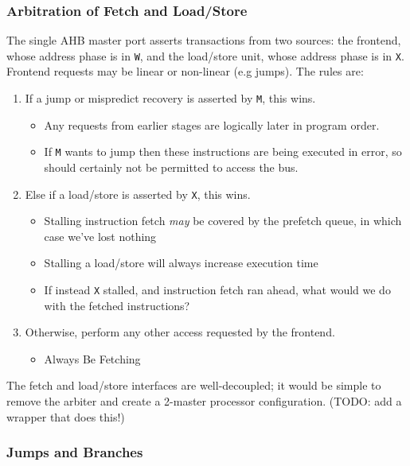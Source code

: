 \documentclass[notitlepage]{article}
\begin{document}
\subsubsection{Arbitration of Fetch and Load/Store}
\label{section:fetch_ls_arb}

The single AHB master port asserts transactions from two sources: the frontend, whose address phase is in \texttt{W}, and the load/store unit, whose address phase is in \texttt{X}. Frontend requests may be linear or non-linear (e.g jumps). The rules are:

\begin{enumerate}
	\item If a jump or mispredict recovery is asserted by \texttt{M}, this wins.
	\begin{itemize}
		\item Any requests from earlier stages are logically later in program order.
		\item If \texttt{M} wants to jump then these instructions are being executed in error, so should certainly not be permitted to access the bus.
	\end{itemize}
	\item Else if a load/store is asserted by \texttt{X}, this wins.
	\begin{itemize}
		\item Stalling instruction fetch \textit{may} be covered by the prefetch queue, in which case we've lost nothing
		\item Stalling a load/store will always increase execution time
		\item If instead \texttt{X} stalled, and instruction fetch ran ahead, what would we do with the fetched instructions?
	\end{itemize}
	\item Otherwise, perform any other access requested by the frontend.
	\begin{itemize}
		\item Always Be Fetching
	\end{itemize}
\end{enumerate}

The fetch and load/store interfaces are well-decoupled; it would be simple to remove the arbiter and create a 2-master processor configuration. (TODO: add a wrapper that does this!)

\subsubsection{Jumps and Branches}
\end{document}
